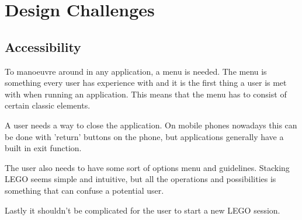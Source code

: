
\section{Design Challenges}
\subsection{Accessibility}
To manoeuvre around in any application, a menu is needed. The menu is something every user has experience with and it is the first thing a user is met with when running an application. This means that the menu has to consist of certain classic elements.\par A user needs a way to close the application. On mobile phones nowadays this can be done with 'return' buttons on the phone, but applications generally have a built in exit function.\par
The user also needs to have some sort of options menu and guidelines. Stacking LEGO seems simple and intuitive, but all the operations and possibilities is something that can confuse a potential user. \par
Lastly it shouldn't be complicated for the user to start a new LEGO session. \par
